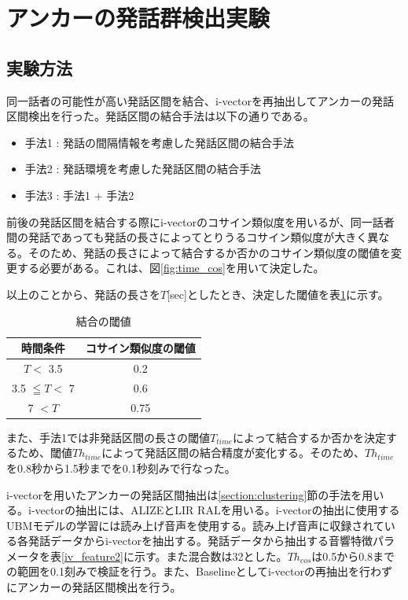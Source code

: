 \section{アンカーの発話群検出実験}
\label{chapter:get_anchor}
\subsection{実験方法}
同一話者の可能性が高い発話区間を結合、i-vectorを再抽出してアンカーの発話区間検出を行った。発話区間の結合手法は以下の通りである。

\begin{itemize}
\item 手法1 : 発話の間隔情報を考慮した発話区間の結合手法
\item 手法2 : 発話環境を考慮した発話区間の結合手法
\item 手法3 : 手法1 + 手法2
\end{itemize}

前後の発話区間を結合する際にi-vectorのコサイン類似度を用いるが、同一話者間の発話であっても発話の長さによってとりうるコサイン類似度が大きく異なる。そのため、発話の長さによって結合するか否かのコサイン類似度の閾値を変更する必要がある。これは、図\ref{fig:time_cos}を用いて決定した。

以上のことから、発話の長さを$T$[sec]としたとき、決定した閾値を表\ref{table:decide_thcos}に示す。

\begin{table}[H]
  \begin{center}
    \caption{結合の閾値 \label{table:decide_thcos}}
    \begin{tabular}{|c||c|} \hline
時間条件 & コサイン類似度の閾値  \\ \hline
$T <$ 3.5 &  0.2 \\ \hline
3.5 $\leqq T <$ 7 &  0.6  \\ \hline
7 $< T$ &  0.75 \\ \hline
    \end{tabular}
  \end{center}
\end{table}

また、手法1では非発話区間の長さの閾値$T_{time}$によって結合するか否かを決定するため、閾値$Th_{time}$によって発話区間の結合精度が変化する。そのため、$Th_{time}$を0.8秒から1.5秒までを0.1秒刻みで行なった。

i-vectorを用いたアンカーの発話区間抽出は\ref{section:clustering}節の手法を用いる。i-vectorの抽出には、ALIZEとLIR RALを用いる。i-vectorの抽出に使用するUBMモデルの学習には読み上げ音声\cite{ATR}を使用する。読み上げ音声に収録されている各発話データからi-vectorを抽出する。発話データから抽出する音響特徴パラメータを表\ref{iv_feature2}に示す。また混合数は32とした。$Th_{cos}$は0.5から0.8までの範囲を0.1刻みで検証を行う。また、Baselineとしてi-vectorの再抽出を行わずにアンカーの発話区間検出を行う。\par


